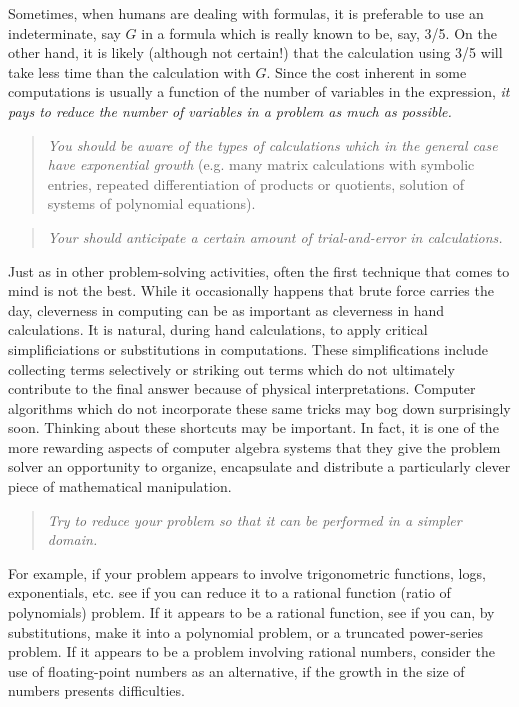 Sometimes, when humans are dealing with formulas, it is
preferable to use an indeterminate, say $G$ in a formula 
which is really known to be, say, 3/5.  On the other
hand, it is likely (although not certain!) that the calculation
using 3/5 will take less time than the calculation with $G$.
Since the cost inherent in some computations is usually
a function
of the number of variables in the expression, {\it it pays to reduce the
number of variables in a problem as much as possible.}

\begin{quote}
{\it You should be aware of the types of calculations which in the general
case have exponential growth} (e.g. many matrix calculations with symbolic
entries, repeated differentiation of products or quotients, solution of systems
of polynomial equations).
\end{quote}


\begin{quote}
{\it Your should anticipate a certain amount of trial-and-error in calculations.} 
\end{quote}
Just as in other problem-solving activities,
often the first technique that comes to mind is not the best.  While it
occasionally happens that brute force carries the day, cleverness in computing
can be as important as cleverness in hand calculations.
It is natural, during hand calculations, to apply critical simplificiations
or substitutions in computations. These simplifications include
collecting terms selectively or striking out terms which do not ultimately
contribute to the final answer because of physical interpretations.
Computer algorithms which do not incorporate these same tricks may bog down
surprisingly soon.  Thinking about these shortcuts may be important. In fact,
it is one of the more
rewarding aspects of computer algebra systems that they give the problem solver
an opportunity to organize, encapsulate and distribute
a particularly clever piece of mathematical manipulation.


\begin{quote}
{\it Try to reduce your problem so that it can be performed in a simpler 
domain.}
\end{quote}
For example, if your problem appears to involve trigonometric functions, logs,
exponentials, etc. see if you can reduce it to a rational function (ratio of
polynomials) problem.
If it appears to be a rational function, see if you can, by substitutions,
make it into a polynomial problem, or a truncated power-series problem.
If it appears to be a problem involving rational numbers, consider the use of
floating-point numbers as an alternative, if the growth in the size of numbers
presents difficulties.

